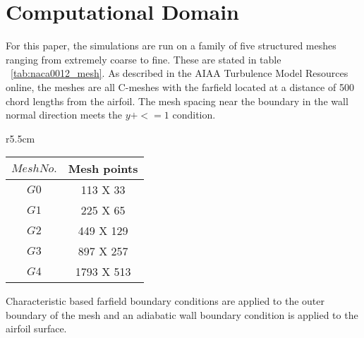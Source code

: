 

\section{Computational Domain}

For this paper, the simulations are run on a family of five structured meshes ranging from extremely coarse to fine. These are stated in table ~\ref{tab:naca0012_mesh}. As described in the AIAA Turbulence Model Resources online, the meshes are all C-meshes with the farfield located at a distance of 500 chord lengths from the airfoil.  The mesh spacing near the boundary in the wall normal direction meets the $y+<=1$ condition.

\begin{wraptable}{r}{5.5cm}
  \begin{center}
  \begin{tabular}{||c|c||} \hline
    $Mesh No.$ &  Mesh points\\ \hline \hline
    $G0$ &  113 X 33\\ \hline \hline
    $G1$ & 225 X 65 \\ \hline 
    $G2$     & 449 X 129 \\ \hline
    $G3$ & 897 X 257 \\ \hline
    $G4$ & 1793 X 513 \\ \hline
  \end{tabular}
  \caption{NACA 0012 meshs.} \label{tab:naca0012_mesh}
  \end{center}
\end{wraptable} 


Characteristic based farfield boundary conditions are applied to the outer boundary of the mesh and an adiabatic wall boundary condition is applied to the airfoil surface.